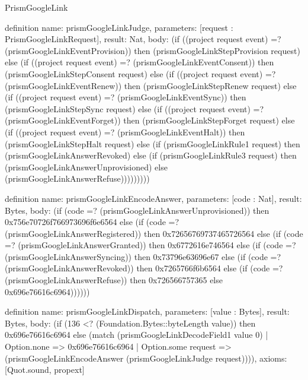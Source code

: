 \begin{lexlean}{PrismGoogleLink}
\begin{semanticmodule}
definition{
  name: prismGoogleLinkJudge,
  parameters: [request : PrismGoogleLinkRequest],
  result: Nat,
  body: (if ((project request event) =? (prismGoogleLinkEventProvision)) then (prismGoogleLinkStepProvision request) else (if ((project request event) =? (prismGoogleLinkEventConsent)) then (prismGoogleLinkStepConsent request) else (if ((project request event) =? (prismGoogleLinkEventRenew)) then (prismGoogleLinkStepRenew request) else (if ((project request event) =? (prismGoogleLinkEventSync)) then (prismGoogleLinkStepSync request) else (if ((project request event) =? (prismGoogleLinkEventForget)) then (prismGoogleLinkStepForget request) else (if ((project request event) =? (prismGoogleLinkEventHalt)) then (prismGoogleLinkStepHalt request) else (if (prismGoogleLinkRule1 request) then (prismGoogleLinkAnswerRevoked) else (if (prismGoogleLinkRule3 request) then (prismGoogleLinkAnswerUnprovisioned) else (prismGoogleLinkAnswerRefuse)))))))))
}

definition{
  name: prismGoogleLinkEncodeAnswer,
  parameters: [code : Nat],
  result: Bytes,
  body: (if (code =? (prismGoogleLinkAnswerUnprovisioned)) then 0x756e70726f766973696f6e6564 else (if (code =? (prismGoogleLinkAnswerRegistered)) then 0x72656769737465726564 else (if (code =? (prismGoogleLinkAnswerGranted)) then 0x6772616e746564 else (if (code =? (prismGoogleLinkAnswerSyncing)) then 0x73796e63696e67 else (if (code =? (prismGoogleLinkAnswerRevoked)) then 0x7265766f6b6564 else (if (code =? (prismGoogleLinkAnswerRefuse)) then 0x726566757365 else 0x696e76616c6964))))))
}

definition{
  name: prismGoogleLinkDispatch,
  parameters: [value : Bytes],
  result: Bytes,
  body: (if (136 <? (Foundation.Bytes::byteLength value)) then 0x696e76616c6964 else (match (prismGoogleLinkDecodeField1 value 0)
    | Option.none => 0x696e76616c6964
    | Option.some request => (prismGoogleLinkEncodeAnswer (prismGoogleLinkJudge request)))),
  axioms: [Quot.sound, propext]
}
\end{semanticmodule}
\end{lexlean}
